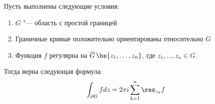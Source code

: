 \begin{theorem}
	Пусть выполнены следующие условия:
	\begin{enumerate}
		\item $G$ "--- область с простой границей
		
		\item Граничные кривые положительно ориентированы относительно $G$
		
		\item Функция $f$ регулярна на $\overline{G}\,\bs \{z_1, \dotsc, z_n\}$, где $z_1, \dotsc, z_n \in G$.
	\end{enumerate}
	
	Тогда верна следующая формула:
	\[\int_{\partial G}fdz = 2\pi i\sum_{k = 1}^n\res_{z_k}f\]
\end{theorem}

